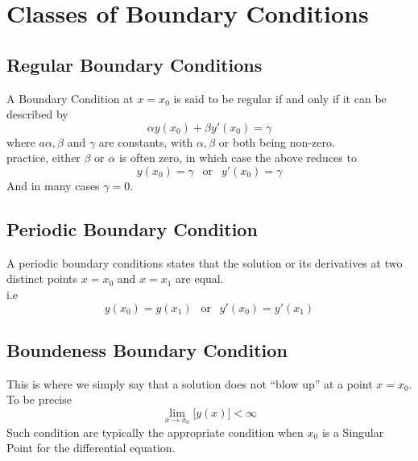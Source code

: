 \documentclass[12pt]{report}
\newcommand{\sps}{\\[0.2cm]}
\newcommand{\NI}{\noindent}
\newcommand{\sprime}{'}
\begin{document}
	\section{Classes of Boundary Conditions}
	\subsection{Regular Boundary Conditions}
	A Boundary Condition at $x=x_0$ is said to be regular if and only if it can be described by
	\begin{equation}
		\alpha y(x_0) + \beta y\sprime(x_0) = \gamma \label{eq:2_7}
	\end{equation}
	where $a\alpha, \beta$ and $\gamma$ are constants, with $\alpha, \beta$ or both being non-zero.\sps
	
	\NI practice, either $\beta$ or $\alpha$ is often zero, in which case the above reduces to
	\begin{equation}
		y(x_0) = \gamma ~~\text{ or }~~ y\sprime(x_0) = \gamma
	\end{equation}
	And in many cases $\gamma = 0$.\sps 
	
	\subsection{Periodic Boundary Condition}
	A periodic boundary conditions states that the solution or its derivatives at two distinct points $x=x_0$ and $x=x_1$ are equal.\sps
	i.e
	\begin{equation}
		y(x_0) = y(x_1) ~~\text{ or } ~~ y\sprime(x_0) = y\sprime(x_1)
	\end{equation}
	
	\subsection{Boundeness Boundary Condition}
	This is where we simply say that a solution does not ``blow up'' at a point $x=x_0$. To be precise
	\begin{equation}
		\lim\limits_{x\rightarrow x_0}\Big[y(x)\Big] < \infty
	\end{equation}
	Such condition are typically the appropriate condition when $x_0$ is a Singular Point for the differential equation.
	
\end{document}
